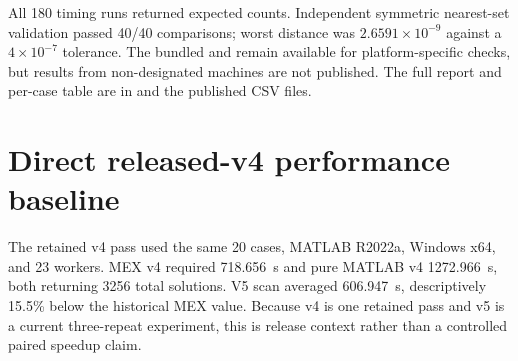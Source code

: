 All 180 timing runs returned expected counts. Independent symmetric nearest-set
validation passed 40/40 comparisons; worst distance was
$2.6591\times10^{-9}$ against a $4\times10^{-7}$ tolerance. The bundled
 and 
remain available for platform-specific checks, but results from non-designated
machines are not published. The full report and per-case table are in
 and the published CSV files.

\section{Direct released-v4 performance baseline}
The retained v4 pass used the same 20 cases, MATLAB R2022a, Windows x64, and 23
workers. MEX v4 required 718.656~s and pure MATLAB v4 1272.966~s, both returning
3256 total solutions. V5 scan averaged 606.947~s, descriptively 15.5\% below
the historical MEX value. Because v4 is one retained pass and v5 is a current
three-repeat experiment, this is release context rather than a controlled paired
speedup claim.
